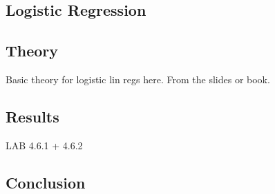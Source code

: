 \subsection{Logistic Regression}\label{sc:logisticRegression}

\subsection{Theory}

Basic theory for logistic lin regs here. From the slides or book.

\subsection{Results}

LAB 4.6.1 + 4.6.2

\subsection{Conclusion}